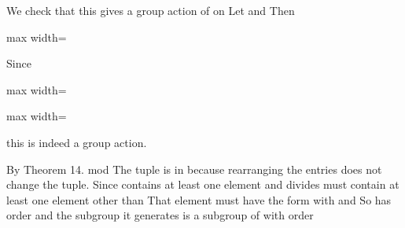 \documentclass[11pt,oneside]{article}
\begin{document}
\begin{BookBody}
\noindent We check that this gives a group action of  on  Let  and   Then

\begin{center}\begin{adjustbox}{max width=\linewidth}\end{adjustbox}\end{center}

\noindent Since

\begin{center}\begin{adjustbox}{max width=\linewidth}\end{adjustbox}\end{center}

\begin{center}\begin{adjustbox}{max width=\linewidth}\end{adjustbox}\end{center}

\noindent this is indeed a group action.

By Theorem 14.  mod  The tuple  is in  because rearranging the entries does not change the tuple. Since  contains at least one element and  divides  must contain at least one element other than  That element must have the form  with  and  So  has order  and the subgroup it generates is a subgroup of  with order \BookEnd{\blacklozenge}


\end{BookBody}
\end{document}
